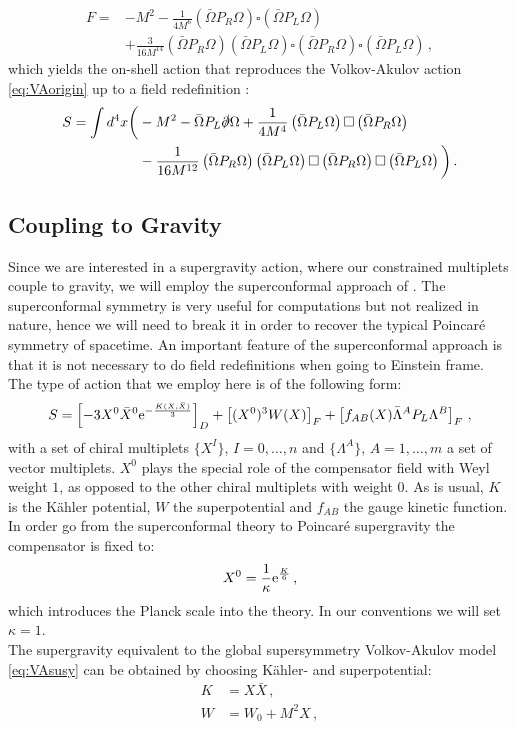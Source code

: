 \documentclass[a4paper,12pt,twoside,openright]{report}
\newcommand{\be}{\begin{equation}}
\newcommand{\ee}{\end{equation}}
\newcommand{\bea}{\begin{equation}\begin{aligned}}
\newcommand{\eea}{\end{aligned}\end{equation}}
\def\rme{{\rm e}}
\begin{document}
\bea 
F = &-M^2 - \frac{1}{4 M^6} \left(\bar{\Omega}P_R  \Omega\right) \square \left(\bar{\Omega}P_L\Omega \right) \\
&+ \frac{3}{16 M^{14}} \left(\bar{\Omega}P_R  \Omega\right)  \left(\bar{\Omega}P_L\Omega \right) \square \left(\bar{\Omega}P_R  \Omega\right) \square \left(\bar{\Omega}P_L\Omega \right)\,,
\eea
which yields the on-shell action that reproduces the Volkov-Akulov action \eqref{eq:VAorigin} up to a field redefinition \cite{Kuzenko:2011tj}:
\bea 
S = \int d^4 x \bigg( &- M^2 - \bar{\Omega}P_L \slashed{\partial} \Omega + \frac{1}{4M^4} \left(\bar{\Omega}P_L\Omega \right) \square \left(\bar{\Omega}P_R\Omega\right)\\
&- \frac{1}{16 M^{12}} \left(\bar{\Omega}P_R\Omega\right)\left(\bar{\Omega}P_L\Omega \right) \square \left(\bar{\Omega}P_R\Omega\right)\square \left(\bar{\Omega}P_L\Omega \right) \bigg)\,.
\eea

\subsection{Coupling to Gravity}
\label{sec:couplinggravity}
Since we are interested in a supergravity action, where our constrained multiplets couple to gravity, we will employ the superconformal approach of \cite{Freedman:2012zz}. The superconformal symmetry is very useful for computations but not realized in nature, hence we will need to break it in order to recover the typical Poincar\'{e} symmetry of spacetime. An important feature of the superconformal approach is that it is not necessary to do field redefinitions when going to Einstein frame. The type of action that we employ here is of the following form:
\be
S = \left[-3 X^0 \bar{X}^0 \rme^{-\frac{K(X,\bar{X})}{3}}\right]_D + \left[(X^0)^3 W (X)\right]_F + \left[f_{AB}(X) \bar{\Lambda}^A P_L \Lambda^B \right]_F\,,
\label{eq:suconfact}
\ee
with a set of chiral multiplets $\{X^I\}$, $I = 0, \ldots , n$ and $\{\Lambda^A\}$, $A=1,\ldots , m$ a set of vector multiplets. $X^0$ plays the special role of the compensator field with Weyl weight $1$, as opposed to the other chiral multiplets with weight $0$. As is usual, $K$ is the Kähler potential, $W$ the superpotential and $f_{AB}$ the gauge kinetic function. In order go from the superconformal theory to Poincar\'{e} supergravity the compensator is fixed to:
\be 
X^0 = \frac{1}{\kappa} \rme^{\frac{K}{6}}\,,
\ee
which introduces the Planck scale into the theory. In our conventions we will set $\kappa = 1$.\\
The supergravity equivalent to the global supersymmetry Volkov-Akulov model \eqref{eq:VAsusy} can be obtained by choosing Kähler- and superpotential:
\bea 
K &= X\bar{X}\,,\\
W &= W_0 + M^2 X\,,
\eea
\end{document}
